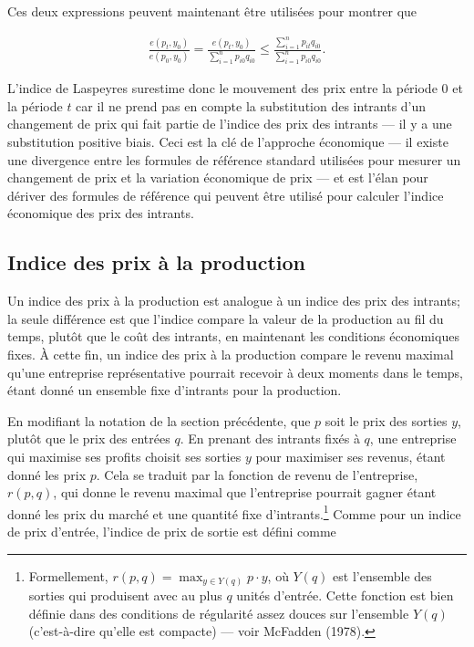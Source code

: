 \documentclass[
]{article}
\begin{document}
Ces deux expressions peuvent maintenant être utilisées pour montrer que

\begin{align*}
\frac{e(p_{t}, y_{0})}{e(p_{0}, y_{0})} = \frac{e(p_{t}, y_{0})}{\sum_{i = 1}^{n} p_{i0} q_{i0}} \leq \frac{\sum_{i = 1}^{n} p_{it} q_{i0}}{\sum_{i = 1 }^{n} p_{i0} q_{i0}}.
\end{align*}

L'indice de Laspeyres surestime donc le mouvement des prix entre la période 0 et la période \(t\) car il ne prend pas en compte la substitution des intrants d'un changement de prix qui fait partie de l'indice des prix des intrants --- il y a une substitution positive biais. Ceci est la clé de l'approche économique --- il existe une divergence entre les formules de référence standard utilisées pour mesurer un changement de prix et la variation économique de prix --- et est l'élan pour dériver des formules de référence qui peuvent être utilisé pour calculer l'indice économique des prix des intrants.

\hypertarget{indice-des-prix-uxe0-la-production}{%
\subsection{Indice des prix à la production}\label{indice-des-prix-uxe0-la-production}}

Un indice des prix à la production est analogue à un indice des prix des intrants; la seule différence est que l'indice compare la valeur de la production au fil du temps, plutôt que le coût des intrants, en maintenant les conditions économiques fixes. À cette fin, un indice des prix à la production compare le revenu maximal qu'une entreprise représentative pourrait recevoir à deux moments dans le temps, étant donné un ensemble fixe d'intrants pour la production.

En modifiant la notation de la section précédente, que \(p\) soit le prix des sorties \(y\), plutôt que le prix des entrées \(q\). En prenant des intrants fixés à \(q\), une entreprise qui maximise ses profits choisit ses sorties \(y\) pour maximiser ses revenus, étant donné les prix \(p\). Cela se traduit par la fonction de revenu de l'entreprise, \(r(p, q)\), qui donne le revenu maximal que l'entreprise pourrait gagner étant donné les prix du marché et une quantité fixe d'intrants.\footnote{Formellement, \(r(p, q) = \max_{y \in Y (q)} p \cdot y\), où \(Y(q)\) est l'ensemble des sorties qui produisent avec au plus \(q\) unités d'entrée. Cette fonction est bien définie dans des conditions de régularité assez douces sur l'ensemble \(Y(q)\) (c'est-à-dire qu'elle est compacte) --- voir McFadden (1978).} Comme pour un indice de prix d'entrée, l'indice de prix de sortie est défini comme
\end{document}
